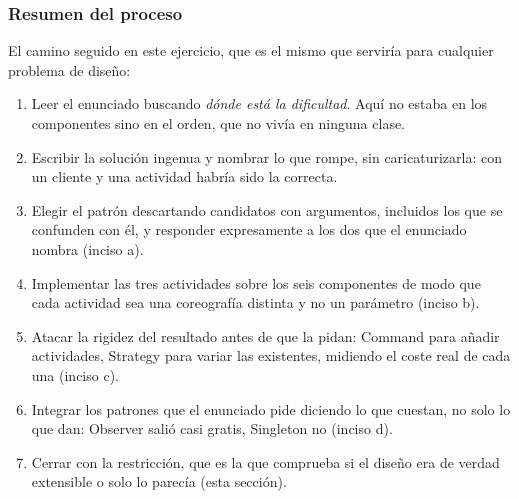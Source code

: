 \subsubsection*{Resumen del proceso}

El camino seguido en este ejercicio, que es el mismo que serviría para cualquier problema de
diseño:

\begin{enumerate}[leftmargin=1.2cm]
    \item Leer el enunciado buscando \emph{dónde está la dificultad}. Aquí no estaba en los
          componentes sino en el orden, que no vivía en ninguna clase.
    \item Escribir la solución ingenua y nombrar lo que rompe, sin caricaturizarla: con un
          cliente y una actividad habría sido la correcta.
    \item Elegir el patrón descartando candidatos con argumentos, incluidos los que se
          confunden con él, y responder expresamente a los dos que el enunciado nombra
          (inciso a).
    \item Implementar las tres actividades sobre los seis componentes de modo que cada
          actividad sea una coreografía distinta y no un parámetro (inciso b).
    \item Atacar la rigidez del resultado antes de que la pidan: Command para añadir
          actividades, Strategy para variar las existentes, midiendo el coste real de cada
          una (inciso c).
    \item Integrar los patrones que el enunciado pide diciendo lo que cuestan, no solo lo que
          dan: Observer salió casi gratis, Singleton no (inciso d).
    \item Cerrar con la restricción, que es la que comprueba si el diseño era de verdad
          extensible o solo lo parecía (esta sección).
\end{enumerate}

\fussy
